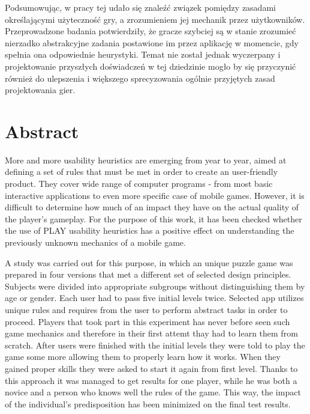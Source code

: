 \documentclass[a4paper,12pt,numbers=noenddot]{report}
\begin{document}
Podsumowując, w pracy tej udało się znaleźć związek pomiędzy zasadami określającymi użyteczność gry, a zrozumieniem jej mechanik przez użytkowników. Przeprowadzone badania potwierdziły, że gracze szybciej są w stanie zrozumieć nierzadko abstrakcyjne zadania postawione im przez aplikację w momencie, gdy spełnia ona odpowiednie heurystyki. Temat nie został jednak wyczerpany i projektowanie przyszłych doświadczeń w tej dziedzinie mogło by się przyczynić również do ulepszenia i większego sprecyzowania ogólnie przyjętych zasad projektowania gier.



\chapter{Abstract}


More and more usability heuristics are emerging from year to year, aimed at defining a set of rules that must be met in order to create an user-friendly product. They cover wide range of computer programs - from most basic interactive applications to even more specific case of mobile games. However, it is difficult to determine how much of an impact they have on the actual quality of the player's gameplay. For the purpose of this work, it has been checked whether the use of PLAY usability heuristics has a positive effect on understanding the previously unknown mechanics of a mobile game.

A study was carried out for this purpose, in which an unique puzzle game was prepared in four versions that met a different set of selected design principles. Subjects were divided into appropriate subgroups without distinguishing them by age or gender. Each user had to pass five initial levels twice. Selected app utilizes unique rules and requires from the user to perform abstract tasks in order to proceed. Players that took part in this experiment has never before seen such game mechanics and therefore in their first attemt thay had to learn them from scratch. After users were finished with the initial levels they were told to play the game some more allowing them to properly learn how it works. When they gained proper skills they were asked to start it again from first level. Thanks to this approach it was managed to get results for one player, while he was both a novice and a person who knows well the rules of the game. This way, the impact of the individual's predisposition has been minimized on the final test results.
\end{document}
